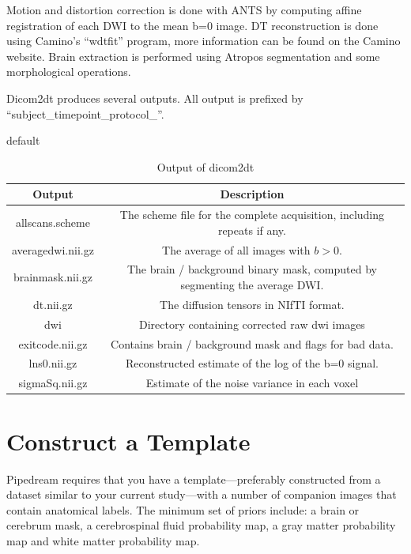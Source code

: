 \documentclass{InsightArticle}
\begin{document}
Motion and distortion correction is done with ANTS by computing affine registration of each DWI to the mean b=0 image. 
DT reconstruction is done using Camino's ``wdtfit'' program, more information can be found on the Camino website.
Brain extraction is performed using Atropos segmentation and some morphological operations.

Dicom2dt produces several outputs. All output is prefixed by ``subject\_timepoint\_protocol\_''.

\begin{table}[htdp]
\caption{default}
\begin{center}
\begin{tabular}{|c|c|}
\hline
\textbf{Output} & \textbf{Description} \\ \hline
allscans.scheme & The scheme file for the complete acquisition, including repeats if any. \\ \hline
averagedwi.nii.gz & The average of all images with $b > 0$. \\ \hline
brainmask.nii.gz & The brain / background binary mask, computed by segmenting the average DWI. \\ \hline
dt.nii.gz         & The diffusion tensors in NIfTI format. \\ \hline
dwi               & Directory containing corrected raw dwi images \\ \hline
exitcode.nii.gz   & Contains brain / background mask and flags for bad data. \\ \hline
lns0.nii.gz       & Reconstructed estimate of the log of the b=0 signal. \\ \hline
sigmaSq.nii.gz    & Estimate of the noise variance in each voxel \\ \hline
\end{tabular}
\end{center}
\label{dicom2dtout}
\caption{Output of dicom2dt}
\end{table}%


\section{Construct a Template}
Pipedream requires that you have a template---preferably constructed
from a dataset similar to your current study---with a number of
companion images that contain anatomical labels.  The minimum set of
priors include: a brain or cerebrum mask, a cerebrospinal fluid
probability map, a gray matter probability map and white matter
probability map.
\end{document}
